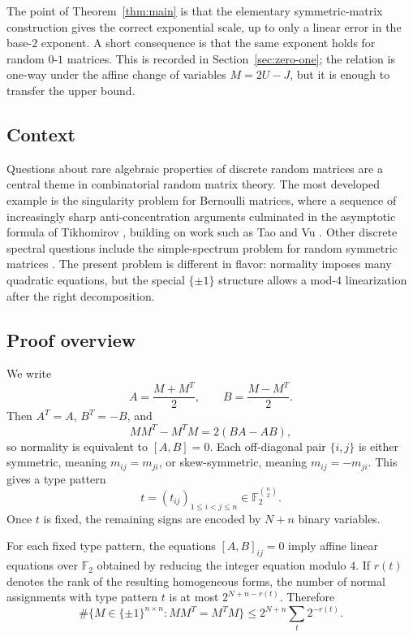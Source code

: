 \documentclass[11pt]{amsart}
\theoremstyle{remark}
\numberwithin{equation}{section}
\newcommand{\F}{\mathbb F}
\begin{document}
The point of Theorem~\ref{thm:main} is that the elementary symmetric-matrix construction gives the correct exponential scale, up to only a linear error in the base-$2$ exponent.  A short consequence is that the same exponent holds for random $0$-$1$ matrices.  This is recorded in Section~\ref{sec:zero-one}; the relation is one-way under the affine change of variables $M=2U-J$, but it is enough to transfer the upper bound.

\subsection{Context}
Questions about rare algebraic properties of discrete random matrices are a central theme in combinatorial random matrix theory.  The most developed example is the singularity problem for Bernoulli matrices, where a sequence of increasingly sharp anti-concentration arguments culminated in the asymptotic formula of Tikhomirov \cite{Tikhomirov2020}, building on work such as Tao and Vu \cite{TaoVu2007}.  Other discrete spectral questions include the simple-spectrum problem for random symmetric matrices \cite{TaoVu2017}.  The present problem is different in flavor: normality imposes many quadratic equations, but the special $\{\pm1\}$ structure allows a mod-$4$ linearization after the right decomposition.
\subsection{Proof overview}
We write
\[
        A=\frac{M+M^T}{2},\qquad B=\frac{M-M^T}{2}.
\]
Then $A^T=A$, $B^T=-B$, and
\[
        MM^T-M^TM=2(BA-AB),
\]
so normality is equivalent to $[A,B]=0$.  Each off-diagonal pair $\{i,j\}$ is either symmetric, meaning $m_{ij}=m_{ji}$, or skew-symmetric, meaning $m_{ij}=-m_{ji}$.  This gives a type pattern
\[
        t=(t_{ij})_{1\leq i<j\leq n}\in \F_2^{\binom n2}.
\]
Once $t$ is fixed, the remaining signs are encoded by $N+n$ binary variables.

For each fixed type pattern, the equations $[A,B]_{ij}=0$ imply affine linear equations over $\F_2$ obtained by reducing the integer equation modulo $4$.  If $r(t)$ denotes the rank of the resulting homogeneous forms, the number of normal assignments with type pattern $t$ is at most $2^{N+n-r(t)}$.  Therefore
\[
        \#\{M\in\{\pm1\}^{n\times n}:MM^T=M^TM\}
        \leq 2^{N+n}\sum_t2^{-r(t)}.
\]
\end{document}
